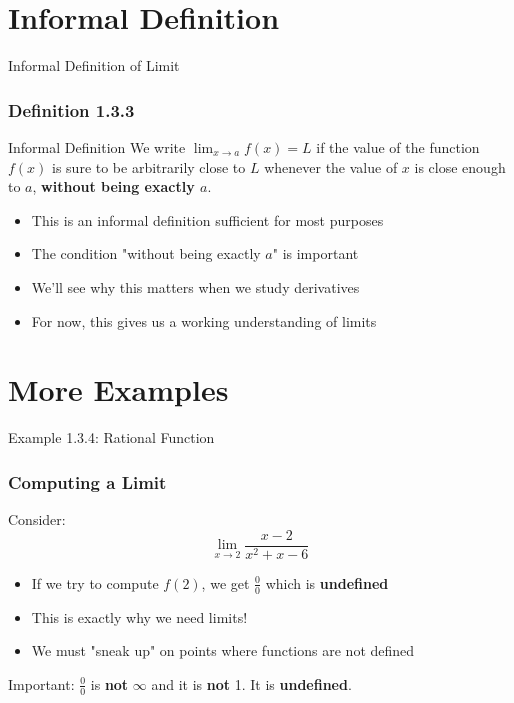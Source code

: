 \documentclass[aspectratio=169]{beamer}
\newcommand{\limx}[2]{\lim_{x \to #1} #2}
\begin{document}
\section{Informal Definition}

\begin{frame}{Informal Definition of Limit}
\frametitle{Definition 1.3.3}

\begin{block}{Informal Definition}
We write $\limx{a}{f(x)} = L$ if the value of the function $f(x)$ is sure to be arbitrarily close to $L$ whenever the value of $x$ is close enough to $a$, \textbf{without being exactly $a$}.
\end{block}

\begin{itemize}
\item This is an informal definition sufficient for most purposes
\item The condition "without being exactly $a$" is important
\item We'll see why this matters when we study derivatives
\item For now, this gives us a working understanding of limits
\end{itemize}

\end{frame}

\section{More Examples}

\begin{frame}{Example 1.3.4: Rational Function}
\frametitle{Computing a Limit}

\begin{block}{Consider:}
$$\limx{2}{\frac{x-2}{x^2+x-6}}$$
\end{block}

\begin{itemize}
\item If we try to compute $f(2)$, we get $\frac{0}{0}$ which is \textbf{undefined}
\item This is exactly why we need limits!
\item We must "sneak up" on points where functions are not defined
\end{itemize}

\begin{block}{Important:}
$\frac{0}{0}$ is \textbf{not} $\infty$ and it is \textbf{not} 1. It is \textbf{undefined}.
\end{block}

\end{frame}
\end{document}
